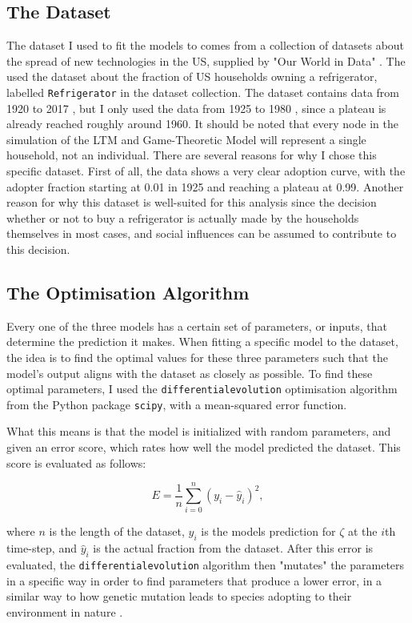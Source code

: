 \documentclass[11pt]{article}
\begin{document}
	\subsection{The Dataset}
	The dataset I used to fit the models to comes from a collection of datasets about the spread of new technologies in the US, supplied by "Our World in Data" \autocite{datasetDiffusion}. The used the dataset about the fraction of US households owning a refrigerator, labelled \texttt{Refrigerator} in the dataset collection. The dataset contains data from 1920 to 2017 , but I only used the data from 1925 to 1980 , since a plateau is already reached roughly around 1960. It should be noted that every node in the simulation of the LTM and Game-Theoretic Model will represent a single household, not an individual.
	There are several reasons for why I chose this specific dataset. First of all, the data shows a very clear adoption curve, with the adopter fraction starting at 0.01 in 1925 and reaching a plateau at 0.99. Another reason for why this dataset is well-suited for this analysis since the decision whether or not to buy a refrigerator is actually made by the households themselves in most cases, and social influences can be assumed to contribute to this decision.
	
	\subsection{The Optimisation Algorithm}
	Every one of the three models has a certain set of parameters, or inputs, that determine the prediction it makes. When fitting a specific model to the dataset, the idea is to find the optimal values for these three parameters such that the model's output aligns with the dataset as closely as possible. To find these optimal parameters, I used the \texttt{differential\textunderscore evolution} optimisation algorithm from the Python package \texttt{scipy}, with a mean-squared error function.
	
	What this means is that the model is initialized with random parameters, and given an error score, which rates how well the model predicted the dataset. This score is evaluated as follows:
	
	$$ E = \frac{1}{n}\sum_{i=0}^n (y_i - \hat{y}_i)^2, $$
	
	where $n$ is the length of the dataset, $y_i$ is the models prediction for $\zeta$ at the $i$th time-step, and $\hat{y}_i$ is the actual fraction from the dataset. After this error is evaluated, the \texttt{differential\textunderscore evolution} algorithm then "mutates" the parameters in a specific way in order to find parameters that produce a lower error, in a similar way to how genetic mutation leads to species adopting to their environment in nature \autocite{DifferentialEvolution}.
	
\end{document}
